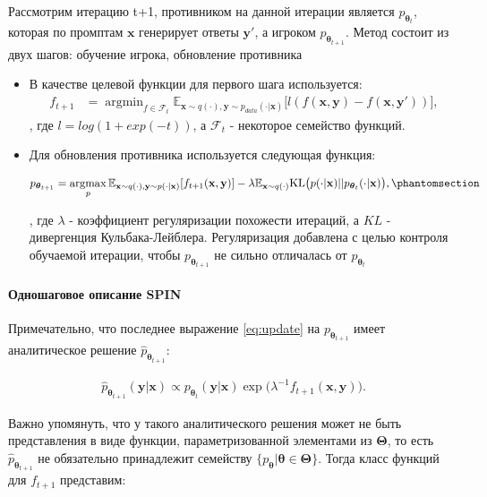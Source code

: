 \documentclass[12pt, twoside]{article}
\newcommand{\bx}{\mathbf{x}}
\newcommand{\by}{\mathbf{y}}
\newcommand{\btheta}{\boldsymbol{\theta}}
\newcommand{\bTheta}{\boldsymbol{\Theta}}
\newcommand{\cF}{\mathcal{F}}
\newcommand{\EE}{\mathbb{E}}
\newcommand{\argmax}{\mathop{\mathrm{argmax}}}
\newcommand{\argmin}{\mathop{\mathrm{argmin}}}
\begin{document}
Рассмотрим итерацию t+1, противником на данной итерации является $p_{\btheta_t}$, которая по промптам $\bx$ генерирует ответы $\by'$, а игроком $p_{\btheta_{t+1}}$. Метод состоит из двух шагов: обучение игрока, обновление противника

\begin{itemize}[label={}]
    \item В качестве целевой функции для первого шага используется:
    \begin{align}
        f_{t+1} &= \argmin_{f \in \cF_{t}}\EE_{\bx\sim q(\cdot), \by\sim p_{data}(\cdot | \bx)}\big[l(f(\bx, \by) - f(\bx, \by')) \big], \label{eq:f*1}
    \end{align}
    , где $l = log(1 + exp(-t))$, а $\cF_t$ - некоторое семейство функций.

    \vspace{8}

    \item Для обновления противника используется следующая функция:
    
    \begin{align} 
        p_{\btheta_{t+1}} = \argmax_ {p}\EE_{\bx \sim q(\cdot), \by\sim p(\cdot|\bx)} [f_{t+1}(\bx, \by)] - \lambda \EE_{\bx\sim q(\cdot)}\mathrm{KL}\big(p(\cdot|\bx)||p_{\btheta_t}(\cdot|\bx)\big), \phantomsection\label{eq:update}
    \end{align} 
    
    , где $\lambda$ - коэффициент регуляризации похожести итераций, а $KL$ - дивергенция Кульбака-Лейблера. Регуляризация добавлена с целью контроля обучаемой итерации, чтобы $p_\btheta_{t+1}$ не сильно отличалась от $p_\btheta_t$
    
    
\end{itemize}

\paragraph{Одношаговое описание SPIN}

Примечательно, что последнее выражение \eqref{eq:update} на $p_{\btheta_{t+1}}$ имеет аналитическое решение $\hat p_{\btheta_{t+1}}$:

\begin{align}
\hat{p}_{\btheta_{t+1}}(\by|\bx) \propto p_{\btheta_t}(\by|\bx) \exp\big(\lambda^{-1}f_{t+1}(\bx, \by)\big). \label{eq:closed form solution}  
\end{align}

Важно упомянуть, что у такого аналитического решения может не быть представления в виде функции, параметризованной элементами из $\bTheta$, то есть $\hat{p}_{\btheta_{t+1}}$ не обязательно принадлежит семейству $\{p_{\btheta} | \btheta \in \bTheta\}$. Тогда класс функций для $f_{t+1}$ представим:
\end{document}
